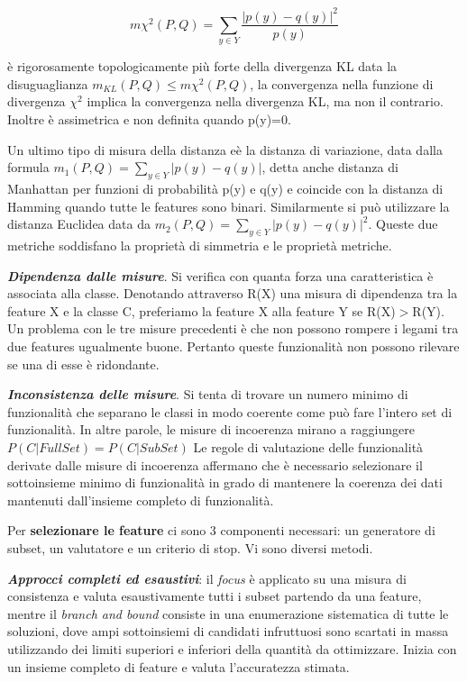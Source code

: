 \documentclass[a4paper]{extarticle}
\begin{document}
\begin{equation}
m \chi ^2(P,Q) = \sum_{y \in Y} \frac{|p(y)-q(y)|^2}{p(y)}
\end{equation}

è rigorosamente topologicamente più forte della divergenza KL data la disuguaglianza $m_{KL}(P,Q) \leq m \chi ^2 (P,Q)$, la convergenza nella funzione di divergenza $\chi ^2$ implica la convergenza nella divergenza KL, ma non il contrario. Inoltre è assimetrica e non definita quando p(y)=0.

Un ultimo tipo di misura della distanza eè la distanza di variazione, data dalla formula $m_1 (P,Q)= \sum_{y \in Y}|p(y)-q(y)|$, detta anche distanza di Manhattan per funzioni di probabilità p(y) e q(y) e coincide con la distanza di Hamming quando tutte le features sono binari. Similarmente si può utilizzare la distanza Euclidea data da $m_2 (P,Q)= \sum_{y \in Y} |p(y)-q(y)|^2$. Queste due metriche soddisfano la proprietà di simmetria e le proprietà metriche.

\textbf{\textit{Dipendenza dalle misure}}. Si verifica con quanta forza una caratteristica è associata alla classe. Denotando attraverso R(X) una misura di dipendenza tra la feature X e la classe C, preferiamo la feature X alla feature Y se R(X)$>$R(Y). Un problema con le tre misure precedenti è che non possono rompere i legami tra due features ugualmente buone. Pertanto queste funzionalità non possono rilevare se una di esse è ridondante.

\textbf{\textit{Inconsistenza delle misure}}. Si tenta di trovare un numero minimo di funzionalità che separano le classi in modo coerente come può fare l'intero set di funzionalità. In altre parole, le misure di incoerenza mirano a raggiungere $P(C|FullSet)= P(C|SubSet)$ Le regole di valutazione delle funzionalità derivate dalle misure di incoerenza affermano che è necessario selezionare il sottoinsieme minimo di funzionalità in grado di mantenere la coerenza dei dati mantenuti dall'insieme completo di funzionalità.

Per \textbf{selezionare le feature} ci sono 3 componenti necessari: un generatore di subset, un valutatore e un criterio di stop. Vi sono diversi metodi. 

\textbf{\textit{Approcci completi ed esaustivi}}: il \textit{focus} è applicato su una misura di consistenza e valuta esaustivamente tutti i subset partendo da una feature, mentre il \textit{branch and bound} consiste in una enumerazione sistematica di tutte le soluzioni, dove ampi sottoinsiemi di candidati infruttuosi sono scartati in massa utilizzando dei limiti superiori e inferiori della quantità da ottimizzare. Inizia con un insieme completo di feature e valuta l'accuratezza stimata. 
\end{document}
